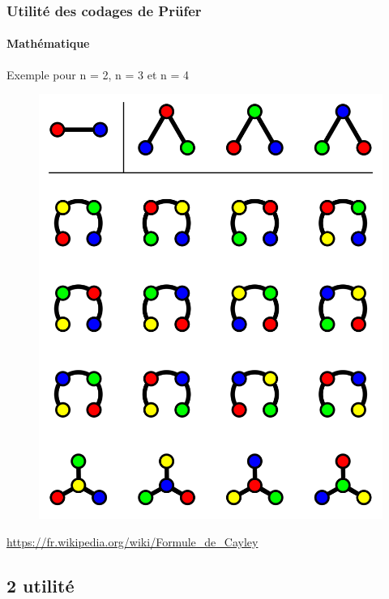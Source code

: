 \documentclass[11pt]{beamer}
\begin{document}
\begin{frame}
\frametitle{Utilité des codages de Prüfer}
\framesubtitle{Mathématique}

\begin{center}
Exemple pour n = 2, n = 3 et n = 4
\end{center}
\begin{figure}[!ht] \center
\includegraphics[scale=0.09]{cayley.png}
\end{figure}

\begin{center}
\tiny{\url{https://fr.wikipedia.org/wiki/Formule_de_Cayley}}
\end{center}

\end{frame}

\subsection{2\ieme{} utilité}
\begin{frame}
\end{frame}
\end{document}
